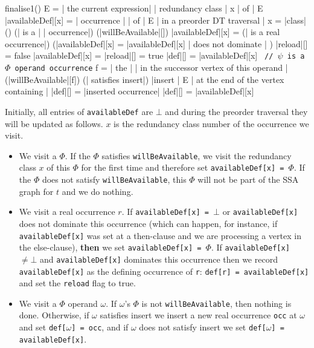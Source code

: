 \documentclass[a4paper,12pt, notitlepage]{article}
\begin{document}
\begin{program}
\PROC finalise1() \BODY
    E = | the current expression|
    \FOREACH | redundancy class | x | of | E \DO
        |availableDef|[x] = \bot
    \OD
    \FOREACH | occurrence | \psi | of | E | in a preorder DT traversal | \DO
        x = |class|(\psi)
        \IF (\psi | is a | \Phi | occurrence|) \AR*
            \IF (|willBeAvailable|[\psi]) \AR*
            |availableDef|[x] = \psi
            \FI
        \ELSIF (\psi | is a real occurrence|) \AR*
            \IF (|availableDef|[x] = \bot \lor |availableDef|[x] | does not dominate | \psi) \AR*
                |reload|[\psi] = false
                |availableDef|[x] = \psi
            \ELSE
                |reload|[\psi] = true
                |def|[\psi] = |availableDef|[x]
            \FI
        \ELSE \texttt{  // $\psi$ is a $\Phi$ operand occurrence}
            f = | the | \Phi | in the successor vertex of this operand |
            \IF (|willBeAvailable|[f]) \AR*
                \IF (\psi | satisfies insert|) \AR*
                    |insert | E | at the end of the vertex containing | \psi
                    |def|[\psi] = |inserted occurrence|
                \ELSE
                    |def|[\psi] = |availableDef|[x]
                \FI
            \FI
        \FI
    \OD
\end{program}
Initially, all entries of \texttt{availableDef} are $\bot$ and during the
preorder traversal they will be updated as follows. $x$ is the redundancy class
number of the occurrence we visit.
\begin{itemize}
\item We visit a $\Phi$. If the $\Phi$ satisfies \texttt{willBeAvailable}, we
visit the redundancy class $x$ of this $\Phi$ for the first time and therefore
set \texttt{availableDef[x] = $\Phi$}. If the $\Phi$ does not satisfy
\texttt{willBeAvailable}, this $\Phi$ will not be part of the SSA graph for $t$
and we do nothing.
\item We visit a real occurrence $r$. If \texttt{availableDef[x] = $\bot$} or
\texttt{availableDef[x]} does not dominate this occurrence (which can happen,
for instance, if \texttt{availableDef[x]} was set at a then-clause and
we are processing a vertex in the else-clause), \textbf{then} we set
\texttt{availableDef[x] = $\Phi$}. If \texttt{availableDef[x] $\not= \bot$} and
\texttt{availableDef[x]} dominates this occurrence then we record
\texttt{availableDef[x]} as the defining occurrence of \texttt{r}: \texttt{def[r] =
    availableDef[x]} and set the \texttt{reload} flag to true.
\item We visit a $\Phi$ operand $\omega$. If $\omega$'s $\Phi$ is not
\texttt{willBeAvailable}, then nothing is done. Otherwise, if $\omega$ satisfies
insert we insert a new real occurrence \texttt{occ} at $\omega$ and set
\texttt{def[$\omega$] = occ}, and if $\omega$ does not satisfy insert we set
\texttt{def[$\omega$] = availableDef[x]}.
\end{itemize}
\end{document}
